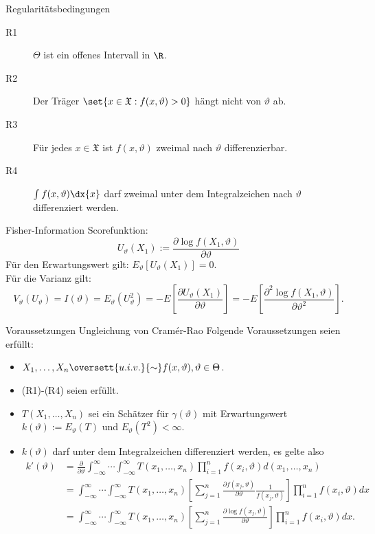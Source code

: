 \begin{karte}{Regularitätsbedingungen}
    \begin{description}
        \item[R1] \(\Theta\) ist ein offenes Intervall in \(\R\).
        \item[R2] Der Träger \(\set{x\in \mathfrak{X}: f(x, \vartheta)>0}\) hängt nicht von \(\vartheta\) ab.
        \item[R3] Für jedes \(x \in \mathfrak{X}\) ist \(f(x, \vartheta)\) zweimal nach \(\vartheta\) differenzierbar.
        \item[R4] \(\int f(x, \vartheta) \dx{x}\) darf zweimal unter dem Integralzeichen nach \(\vartheta\) differenziert werden.
    \end{description}
\end{karte}

\begin{karte}{Fisher-Information}
    Scorefunktion: 
    \[ U_\vartheta(X_1) := \frac{\partial \log f(X_1, \vartheta)}{\partial \vartheta} \]
    Für den Erwartungswert gilt: \(E_\vartheta[U_\vartheta(X_1)] = 0 \).\\
    Für die Varianz gilt: 
    \[ V_\vartheta(U_\vartheta) = I(\vartheta) = E_\vartheta(U_\vartheta^2) = -E\left[ \frac{\partial U_\vartheta(X_1)}{\partial \vartheta} \right] = -E\left[\frac{\partial^2 \log f(X_1, \vartheta)}{\partial \vartheta^2}\right]. \]
\end{karte}

\begin{karte}{Voraussetzungen Ungleichung von Cramér-Rao}
    Folgende Voraussetzungen seien erfüllt: 
    \begin{itemize}
        \item \(X_1, \ldots, X_n \oversett{u.i.v.}{\sim} f(x, \vartheta), \vartheta \in \Theta\).
        \item (R1)-(R4) seien erfüllt.
        \item \(T(X_1, \ldots, X_n)\) sei ein Schätzer für \(\gamma(\vartheta)\) mit Erwartungswert \(k(\vartheta) := E_\vartheta(T) \) und \(E_\vartheta(T^2) < \infty\).
        \item \(k(\vartheta)\) darf unter dem Integralzeichen differenziert werden, es gelte also 
        \begin{align*}
            k'(\vartheta) &= \frac{\partial}{\partial \vartheta} \int_{-\infty}^\infty \cdots \int_{-\infty}^\infty T(x_1, \ldots, x_n) \prod_{i=1}^n f(x_i, \vartheta) d(x_1, \ldots, x_n) \\
            &= \int_{-\infty}^\infty \cdots \int_{-\infty}^\infty T(x_1, \ldots, x_n) \left[ \sum_{j=1}^n \frac{\partial f(x_j, \vartheta)}{\partial \vartheta} \frac{1}{f(x_j, \vartheta)} \right] \prod_{i=1}^n f(x_i, \vartheta) dx \\
            &= \int_{-\infty}^\infty \cdots \int_{-\infty}^\infty T(x_1, \ldots, x_n) \left[ \sum_{j=1}^n \frac{\partial \log f(x_j, \vartheta)}{\partial \vartheta} \right] \prod_{i=1}^n f(x_i, \vartheta) dx.
        \end{align*}
    \end{itemize}
\end{karte}

